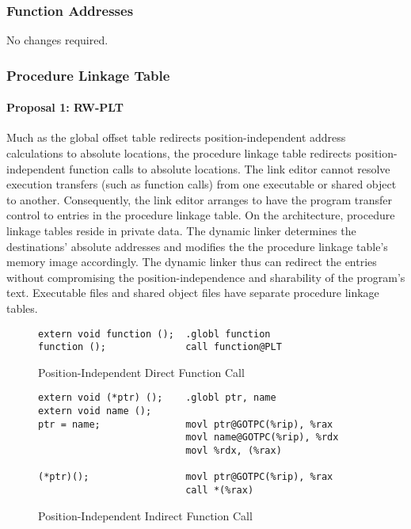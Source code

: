 \subsubsection{Function Addresses}

No changes required.

\subsubsection{Procedure Linkage Table}


\paragraph{Proposal 1: RW-PLT}


Much as the global offset table redirects position-independent address
calculations to absolute locations, the procedure linkage table
redirects position-independent function calls to absolute locations.
The link editor cannot resolve execution transfers (such as function
calls) from one executable or shared object to another.  Consequently,
the link editor arranges to have the program transfer control to
entries in the procedure linkage table.  On the \xARCH architecture,
procedure linkage tables reside in private data.  The dynamic linker
determines the destinations' absolute addresses and modifies the the
procedure linkage table's memory image accordingly.  The dynamic
linker thus can redirect the entries without compromising the
position-independence and sharability of the program's text.
Executable files and shared object files have separate procedure
linkage tables.

\begin{figure}[H]
\caption{Position-Independent Direct Function Call}
\begin{verbatim}
extern void function ();  .globl function
function ();              call function@PLT
\end{verbatim}
\end{figure}

\begin{figure}[H]
\caption{Position-Independent Indirect Function Call}
\begin{verbatim}
extern void (*ptr) ();    .globl ptr, name
extern void name ();
ptr = name;               movl ptr@GOTPC(%rip), %rax
                          movl name@GOTPC(%rip), %rdx
                          movl %rdx, (%rax)

(*ptr)();                 movl ptr@GOTPC(%rip), %rax
                          call *(%rax)
\end{verbatim}
\end{figure}

